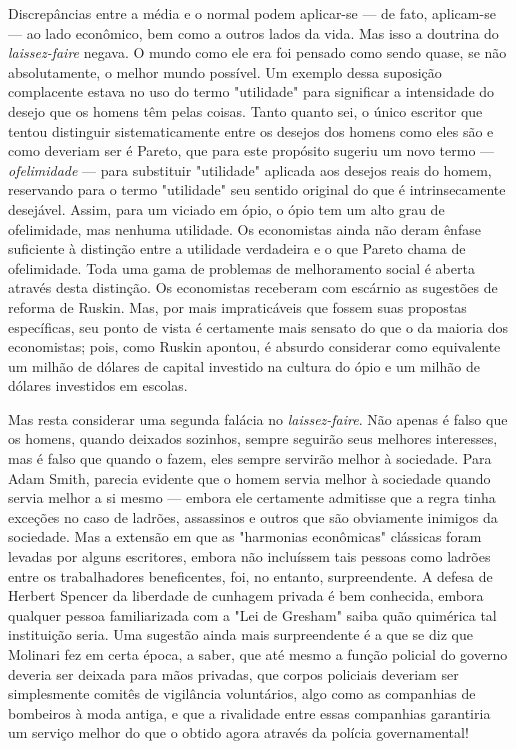 \documentclass[12pt]{article}
\begin{document}
Discrepâncias entre a média e o normal podem aplicar-se — de fato, aplicam-se — ao lado econômico, bem como a outros lados da vida. Mas isso a doutrina do \textit{laissez-faire} negava. O mundo como ele era foi pensado como sendo quase, se não absolutamente, o melhor mundo possível. Um exemplo dessa suposição complacente estava no uso do termo "utilidade" para significar a intensidade do desejo que os homens têm pelas coisas. Tanto quanto sei, o único escritor que tentou distinguir sistematicamente entre os desejos dos homens como eles são e como deveriam ser é Pareto, que para este propósito sugeriu um novo termo — \textit{ofelimidade} — para substituir "utilidade" aplicada aos desejos reais do homem, reservando para o termo "utilidade" seu sentido original do que é intrinsecamente desejável. Assim, para um viciado em ópio, o ópio tem um alto grau de ofelimidade, mas nenhuma utilidade. Os economistas ainda não deram ênfase suficiente à distinção entre a utilidade verdadeira e o que Pareto chama de ofelimidade. Toda uma gama de problemas de melhoramento social é aberta através desta distinção. Os economistas receberam com escárnio as sugestões de reforma de Ruskin. Mas, por mais impraticáveis que fossem suas propostas específicas, seu ponto de vista é certamente mais sensato do que o da maioria dos economistas; pois, como Ruskin apontou, é absurdo considerar como equivalente um milhão de dólares de capital investido na cultura do ópio e um milhão de dólares investidos em escolas.

Mas resta considerar uma segunda falácia no \textit{laissez-faire}. Não apenas é falso que os homens, quando deixados sozinhos, sempre seguirão seus melhores interesses, mas é falso que quando o fazem, eles sempre servirão melhor à sociedade. Para Adam Smith, parecia evidente que o homem servia melhor à sociedade quando servia melhor a si mesmo — embora ele certamente admitisse que a regra tinha exceções no caso de ladrões, assassinos e outros que são obviamente inimigos da sociedade. Mas a extensão em que as "harmonias econômicas" clássicas foram levadas por alguns escritores, embora não incluíssem tais pessoas como ladrões entre os trabalhadores beneficentes, foi, no entanto, surpreendente. A defesa de Herbert Spencer da liberdade de cunhagem privada é bem conhecida, embora qualquer pessoa familiarizada com a "Lei de Gresham" saiba quão quimérica tal instituição seria. Uma sugestão ainda mais surpreendente é a que se diz que Molinari fez em certa época, a saber, que até mesmo a função policial do governo deveria ser deixada para mãos privadas, que corpos policiais deveriam ser simplesmente comitês de vigilância voluntários, algo como as companhias de bombeiros à moda antiga, e que a rivalidade entre essas companhias garantiria um serviço melhor do que o obtido agora através da polícia governamental!
\end{document}
